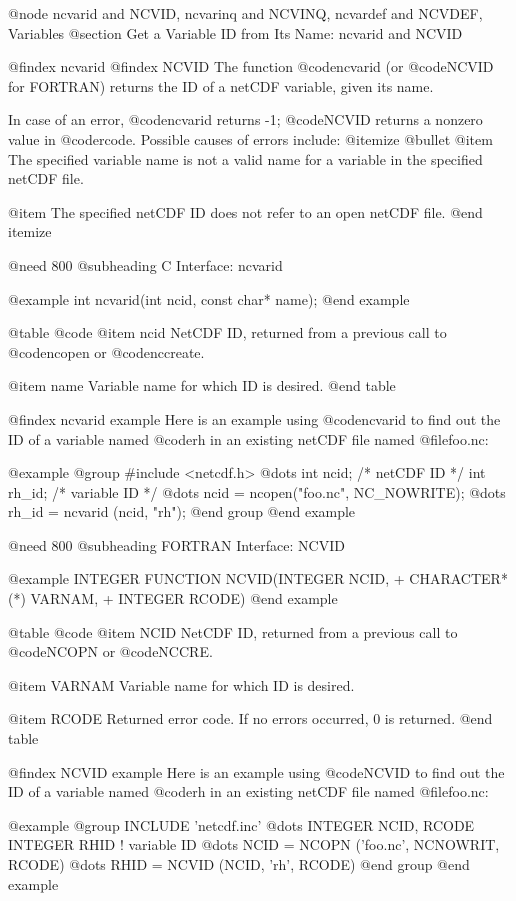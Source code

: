 @node ncvarid and NCVID, ncvarinq and NCVINQ, ncvardef and NCVDEF, Variables
@section Get a Variable ID from Its Name:  ncvarid and NCVID

@findex ncvarid
@findex NCVID
The function @code{ncvarid} (or @code{NCVID} for FORTRAN) returns the ID
of a netCDF variable, given its name.

In case of an error, @code{ncvarid} returns -1; @code{NCVID} returns a
nonzero value in @code{rcode}.  Possible causes of errors include:
@itemize @bullet
@item
The specified variable name is not a valid name for a variable in the
specified netCDF file.

@item
The specified netCDF ID does not refer to an open netCDF file.
@end itemize

@need 800
@subheading C Interface:  ncvarid

@example
int ncvarid(int ncid, const char* name);
@end example

@table @code
@item ncid
NetCDF ID, returned from a previous call to @code{ncopen} or @code{nccreate}.

@item name
Variable name for which ID is desired.
@end table

@findex ncvarid example
Here is an example using @code{ncvarid} to find out the ID of a variable
named @code{rh} in an existing netCDF file named @file{foo.nc}:

@example
@group
#include <netcdf.h>
   @dots{}
int  ncid;                         /* netCDF ID */
int  rh_id;                        /* variable ID */
   @dots{}
ncid = ncopen("foo.nc", NC_NOWRITE);
   @dots{}
rh_id = ncvarid (ncid, "rh");
@end group
@end example

@need 800
@subheading FORTRAN Interface:  NCVID

@example
      INTEGER FUNCTION NCVID(INTEGER NCID,
     +                       CHARACTER*(*) VARNAM,
     +                       INTEGER RCODE)
@end example

@table @code
@item NCID
NetCDF ID, returned from a previous call to @code{NCOPN} or @code{NCCRE}.

@item VARNAM
Variable name for which ID is desired.

@item RCODE
Returned error code.  If no errors occurred, 0 is returned.
@end table

@findex NCVID example
Here is an example using @code{NCVID} to find out the ID of a variable
named @code{rh} in an existing netCDF file named @file{foo.nc}:

@example
@group
      INCLUDE 'netcdf.inc'
         @dots{}
      INTEGER  NCID, RCODE
      INTEGER  RHID                    ! variable ID
         @dots{}
      NCID = NCOPN ('foo.nc', NCNOWRIT, RCODE)
         @dots{}
      RHID = NCVID (NCID, 'rh', RCODE)
@end group
@end example

